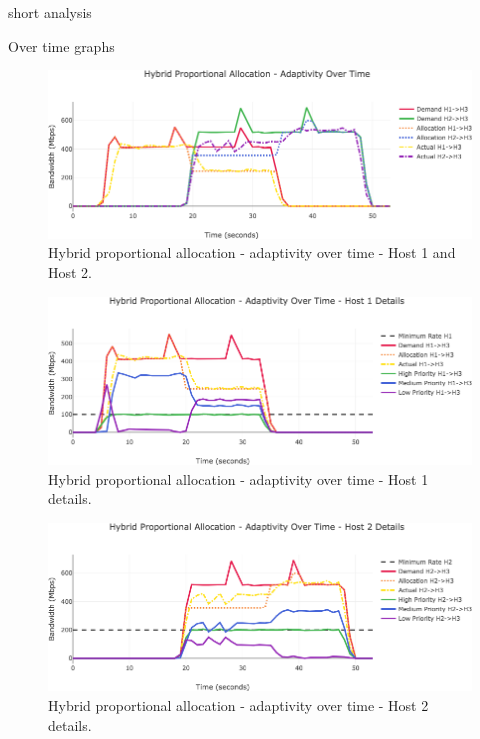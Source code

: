 \documentclass[accepted,single]{gipaper}
\begin{document}
short analysis

Over time graphs

\begin{figure}
	\centering
	\includegraphics[width=6in]{figs/dbah_ot_udp_both.png}
	\caption{ Hybrid proportional allocation - adaptivity over time - Host 1 and Host 2. } \label{dbah_ot_both}
\end{figure}

\begin{figure}
	\centering
	\includegraphics[width=6in]{figs/dbah_ot_udp_h1.png}
	\caption{ Hybrid proportional allocation - adaptivity over time - Host 1 details. } \label{dpah_ot_h1}
\end{figure}

\begin{figure}
	\centering
	\includegraphics[width=6in]{figs/dbah_ot_udp_h2.png}
	\caption{ Hybrid proportional allocation - adaptivity over time - Host 2 details. } \label{dbah_ot_h2}
\end{figure}
\end{document}
